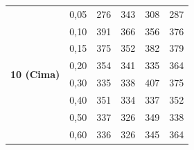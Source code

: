 \begin{table}
\begin{tabular}{clrrrr}
    \hline
    \multirow{8}{*}{\textbf{10 (Cima)}}                   & 0,05                                                            & 276                        & 343                        & 308                        & 287                         \\
                                                          & 0,10                                                            & 391                        & 366                        & 356                        & 376                         \\
                                                          & 0,15                                                            & 375                        & 352                        & 382                        & 379                         \\
                                                          & 0,20                                                            & 354                        & 341                        & 335                        & 364                         \\
                                                          & 0,30                                                            & 335                        & 338                        & 407                        & 375                         \\
                                                          & 0,40                                                            & 351                        & 334                        & 337                        & 352                         \\
                                                          & 0,50                                                            & 337                        & 326                        & 349                        & 338                         \\
                                                          & 0,60                                                            & 336                        & 326                        & 345                        & 364                         \\
    \bottomrule
    \end{tabular}
    \end{table}
